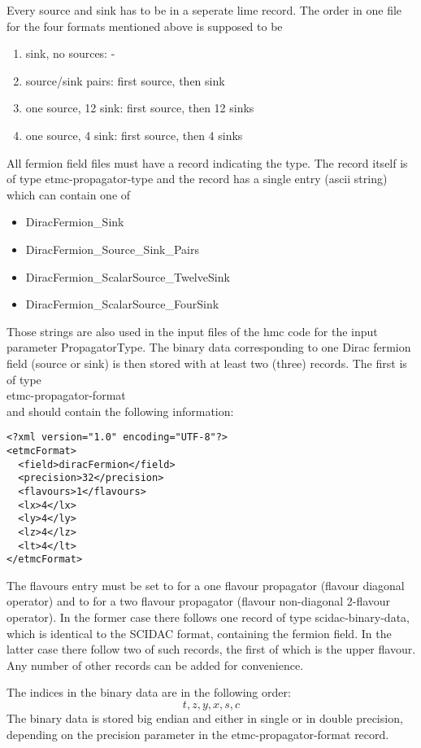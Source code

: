 Every source and sink has to be in a seperate lime record. The order
in one file for the four formats mentioned above is supposed to be 
\begin{enumerate}
\item sink, no sources: -
\item source/sink pairs: first source, then sink
\item one source, 12 sink: first source, then 12 sinks
\item one source, 4 sink: first source, then 4 sinks
\end{enumerate}
All fermion field files must have a record indicating the type. The
record itself is of type {\ttfamily etmc-propagator-type} and the
record has a single entry (ascii string) which can contain one of 
\begin{itemize}
\item {\ttfamily DiracFermion\_Sink}
\item {\ttfamily DiracFermion\_Source\_Sink\_Pairs}
\item {\ttfamily DiracFermion\_ScalarSource\_TwelveSink}
\item {\ttfamily DiracFermion\_ScalarSource\_FourSink}
\end{itemize}
Those strings are also used in the input files of the hmc code for the
input parameter {\ttfamily PropagatorType}.
The binary data corresponding to one Dirac fermion field (source or
sink) is then stored with at least two (three) records. The first is
of type \\
{\ttfamily etmc-propagator-format} \\
and should contain the following information:
\begin{verbatim}
<?xml version="1.0" encoding="UTF-8"?>
<etmcFormat>
  <field>diracFermion</field>
  <precision>32</precision>
  <flavours>1</flavours>
  <lx>4</lx>
  <ly>4</ly>
  <lz>4</lz>
  <lt>4</lt>
</etmcFormat>
\end{verbatim}
The {\ttfamily flavours} entry must be set to {} for a one
flavour propagator (flavour diagonal operator) and to {} for a two
flavour propagator (flavour non-diagonal 2-flavour operator). In the
former case there follows one record of type
{\ttfamily scidac-binary-data}, which is identical to the SCIDAC
format, containing the fermion field. In the latter case there follow
two of such records, the first of which is the upper flavour.
Any number of other records can be added for convenience.

The indices in the binary data are in the following order:
\[
t, z, y, x, s, c
\]
The binary data is stored big endian and either in single or in double
precision, depending on the {\ttfamily precision} parameter in the
{\ttfamily etmc-propagator-format} record.

